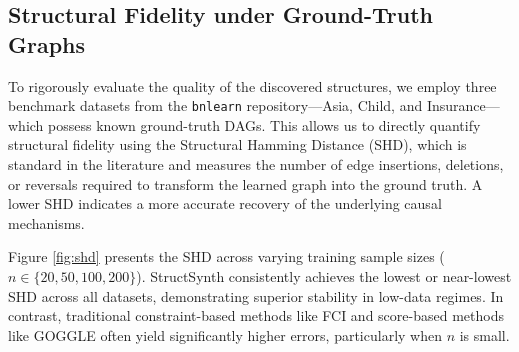 


\subsection{Structural Fidelity under Ground-Truth Graphs}

To rigorously evaluate the quality of the discovered structures, we employ three benchmark datasets from the \texttt{bnlearn} repository---Asia, Child, and Insurance---which possess known ground-truth DAGs. This allows us to directly quantify structural fidelity using the Structural Hamming Distance (SHD), which is standard in the literature and measures the number of edge insertions, deletions, or reversals required to transform the learned graph into the ground truth. A lower SHD indicates a more accurate recovery of the underlying causal mechanisms.

Figure \ref{fig:shd} presents the SHD across varying training sample sizes ($n \in \{20, 50, 100, 200\}$). \textsf{StructSynth} consistently achieves the lowest or near-lowest SHD across all datasets, demonstrating superior stability in low-data regimes. In contrast, traditional constraint-based methods like FCI and score-based methods like GOGGLE often yield significantly higher errors, particularly when $n$ is small.

